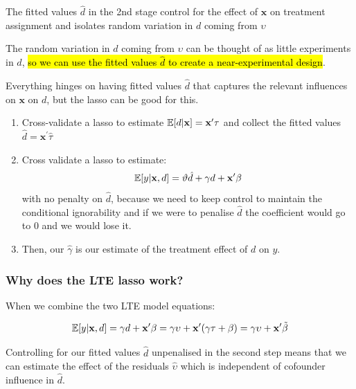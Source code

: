\documentclass[11pt]{article}
\begin{document}
The fitted values $\hat{d}$ in the 2nd stage control for the effect of $\mathbf{x}$ on treatment assignment and isolates random variation in $d$ coming from $\upsilon$
\begin{note}
    The random variation in $d$ coming from $\upsilon$ can be thought of as little experiments in $d$, \hl{so we can use the fitted values $\hat{d}$ to create a near-experimental design}.
\end{note}

Everything hinges on having fitted values $\hat{d}$ that captures the relevant influences on $\mathbf{x}$ on $d$, but the lasso can be good for this.

\begin{algo}
\hspace{1in}
    \begin{enumerate}
        \item Cross-validate a lasso to estimate $\mathbb{E}[d|\mathbf{x}] = \mathbf{x^\prime}\tau$ and collect the fitted values $\hat{d} = \mathbf{x^\prime}\hat{\tau}$
        \item Cross validate a lasso to estimate:
        \begin{equation}
            \label{2nd step LTE lasso}
            \mathbb{E}[y|\mathbf{x}, d] = \vartheta \hat{d} + \gamma d + \mathbf{x^\prime}\beta
        \end{equation}
        with no penalty on $\hat{d}$, because we need to keep control to maintain the conditional ignorability and if we were to penalise $\hat{d}$ the coefficient would go to 0 and we would lose it.
        \item Then, our $\hat{\gamma}$ is our estimate of the treatment effect of $d$ on $y$.
    \end{enumerate}
\end{algo}

\subsubsection{Why does the LTE lasso work?}

When we combine the two LTE model equations:

\begin{equation*}
    \mathbb{E}[y|\mathbf{x},d] = \gamma d + \mathbf{x^\prime}\beta = \gamma\upsilon + \mathbf{x^\prime}(\gamma\tau + \beta) = \gamma\upsilon + \mathbf{x^\prime}\tilde{\beta}
\end{equation*}

Controlling for our fitted values $\hat{d}$ unpenalised in the second step means that we can estimate the effect of the residuals $\hat{\upsilon}$ which is independent of cofounder influence in $\hat{d}$.
\end{document}
